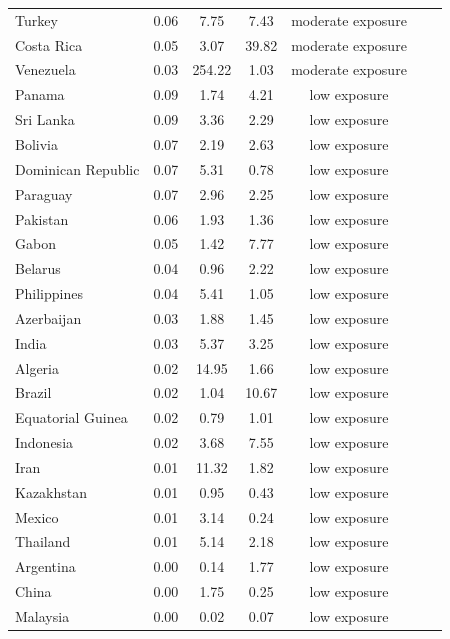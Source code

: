 \documentclass[fleqn,10pt,twocolumn]{wlscirep}
\begin{document}
\begin{longtable}{lrccccc}
	Turkey & 0.06 & 7.75 & 7.43 & moderate exposure \\
	Costa Rica & 0.05 & 3.07 & 39.82 & moderate exposure \\
	Venezuela & 0.03 & 254.22 & 1.03 & moderate exposure \\
	Panama & 0.09 & 1.74 & 4.21 & low exposure \\
	Sri Lanka & 0.09 & 3.36 & 2.29 & low exposure \\
	Bolivia & 0.07 & 2.19 & 2.63 & low exposure \\
	Dominican Republic & 0.07 & 5.31 & 0.78 & low exposure \\
	Paraguay & 0.07 & 2.96 & 2.25 & low exposure \\
	Pakistan & 0.06 & 1.93 & 1.36 & low exposure \\
	Gabon & 0.05 & 1.42 & 7.77 & low exposure \\
	Belarus & 0.04 & 0.96 & 2.22 & low exposure \\
	Philippines & 0.04 & 5.41 & 1.05 & low exposure \\
	Azerbaijan & 0.03 & 1.88 & 1.45 & low exposure \\
	India & 0.03 & 5.37 & 3.25 & low exposure \\
	Algeria & 0.02 & 14.95 & 1.66 & low exposure \\
	Brazil & 0.02 & 1.04 & 10.67 & low exposure \\
	Equatorial Guinea & 0.02 & 0.79 & 1.01 & low exposure \\
	Indonesia & 0.02 & 3.68 & 7.55 & low exposure \\
	Iran & 0.01 & 11.32 & 1.82 & low exposure \\
	Kazakhstan & 0.01 & 0.95 & 0.43 & low exposure \\
	Mexico & 0.01 & 3.14 & 0.24 & low exposure \\
	Thailand & 0.01 & 5.14 & 2.18 & low exposure \\
	Argentina & 0.00 & 0.14 & 1.77 & low exposure \\
	China & 0.00 & 1.75 & 0.25 & low exposure \\
	Malaysia & 0.00 & 0.02 & 0.07 & low exposure \\
	
	
	
\end{longtable}
\end{document}
